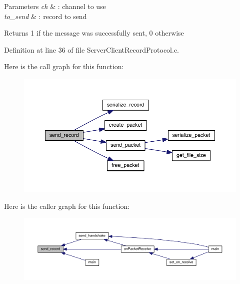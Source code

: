 \begin{DoxyParams}{Parameters}
{\em ch} & \+: channel to use \\
\hline
{\em to\+\_\+send} & \+: record to send \\
\hline
\end{DoxyParams}
\begin{DoxyReturn}{Returns}
1 if the message was successfully sent, 0 otherwise 
\end{DoxyReturn}


Definition at line 36 of file Server\+Client\+Record\+Protocol.\+c.



Here is the call graph for this function\+:\nopagebreak
\begin{figure}[H]
\begin{center}
\leavevmode
\includegraphics[width=350pt]{_server_client_record_protocol_8c_a1b5ebed9d99a7ae01e6f8c5c464aad45_cgraph}
\end{center}
\end{figure}




Here is the caller graph for this function\+:\nopagebreak
\begin{figure}[H]
\begin{center}
\leavevmode
\includegraphics[width=350pt]{_server_client_record_protocol_8c_a1b5ebed9d99a7ae01e6f8c5c464aad45_icgraph}
\end{center}
\end{figure}


